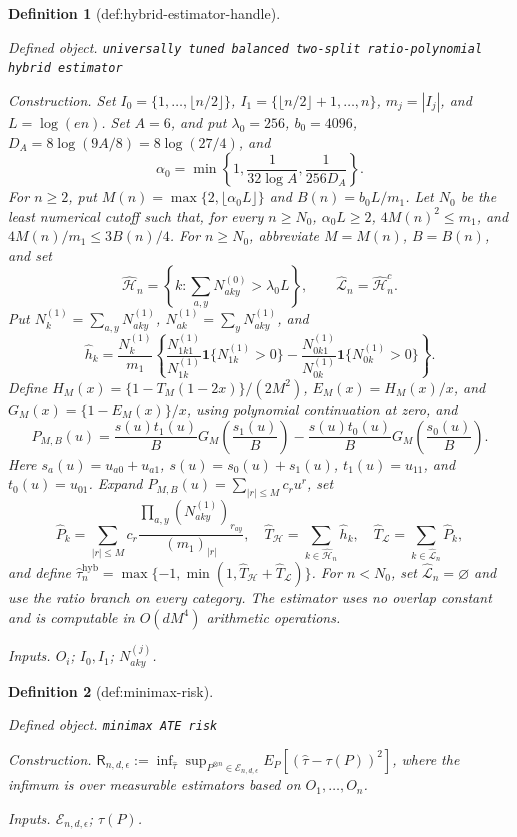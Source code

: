 \documentclass{article}
\newtheorem{definition}{Definition}
\begin{document}
\begin{definition}[def:hybrid-estimator-handle]\label{def:hybrid-estimator-handle}
\par\smallskip\noindent\emph{Defined object.} \texttt{universally tuned balanced two-split ratio-polynomial hybrid estimator}
\par\smallskip\noindent\emph{Construction.} Set \(I_0=\{1,\ldots,\lfloor n/2\rfloor\}\), \(I_1=\{\lfloor n/2\rfloor+1,\ldots,n\}\), \(m_j=|I_j|\), and \(L=\log(en)\). Set \(A=6\), and put \(\lambda_0=256\), \(b_0=4096\), \(D_A=8\log(9A/8)=8\log(27/4)\), and
\[
\alpha_0=\min\left\{1,\frac1{32\log A},\frac1{256D_A}\right\}.
\]
For \(n\ge2\), put \(M(n)=\max\{2,\lfloor\alpha_0L\rfloor\}\) and \(B(n)=b_0L/m_1\). Let \(N_0\) be the least numerical cutoff such that, for every \(n\ge N_0\), \(\alpha_0L\ge2\), \(4M(n)^2\le m_1\), and \(4M(n)/m_1\le3B(n)/4\). For \(n\ge N_0\), abbreviate \(M=M(n)\), \(B=B(n)\), and set
\[
\widehat{\mathcal H}_n=\left\{k:\sum_{a,y}N^{(0)}_{aky}>\lambda_0L\right\},\qquad \widehat{\mathcal L}_n=\widehat{\mathcal H}_n^c.
\]
Put \(N_k^{(1)}=\sum_{a,y}N^{(1)}_{aky}\), \(N_{ak}^{(1)}=\sum_yN^{(1)}_{aky}\), and
\[
\widehat h_k=\frac{N_k^{(1)}}{m_1}\left\{\frac{N^{(1)}_{1k1}}{N^{(1)}_{1k}}\mathbf1\{N^{(1)}_{1k}>0\}-\frac{N^{(1)}_{0k1}}{N^{(1)}_{0k}}\mathbf1\{N^{(1)}_{0k}>0\}\right\}.
\]
Define \(H_M(x)=\{1-T_M(1-2x)\}/(2M^2)\), \(E_M(x)=H_M(x)/x\), and \(G_M(x)=\{1-E_M(x)\}/x\), using polynomial continuation at zero, and
\[
P_{M,B}(u)=\frac{s(u)t_1(u)}B G_M\!\left(\frac{s_1(u)}B\right)-\frac{s(u)t_0(u)}B G_M\!\left(\frac{s_0(u)}B\right).
\]
Here \(s_a(u)=u_{a0}+u_{a1}\), \(s(u)=s_0(u)+s_1(u)\), \(t_1(u)=u_{11}\), and \(t_0(u)=u_{01}\). Expand \(P_{M,B}(u)=\sum_{|r|\le M}c_ru^r\), set
\[
\widehat P_k=\sum_{|r|\le M}c_r\frac{\prod_{a,y}(N^{(1)}_{aky})_{r_{ay}}}{(m_1)_{|r|}},\quad \widehat T_{\mathcal H}=\sum_{k\in\widehat{\mathcal H}_n}\widehat h_k,\quad \widehat T_{\mathcal L}=\sum_{k\in\widehat{\mathcal L}_n}\widehat P_k,
\]
and define \(\widehat\tau_n^{\mathrm{hyb}}=\max\{-1,\min(1,\widehat T_{\mathcal H}+\widehat T_{\mathcal L})\}\). For \(n<N_0\), set \(\widehat{\mathcal L}_n=\varnothing\) and use the ratio branch on every category. The estimator uses no overlap constant and is computable in \(O(dM^4)\) arithmetic operations.
\par\smallskip\noindent\emph{Inputs.} \(O_i\); \(I_0,I_1\); \(N^{(j)}_{aky}\).
\end{definition}

\begin{definition}[def:minimax-risk]\label{def:minimax-risk}
\par\smallskip\noindent\emph{Defined object.} \texttt{minimax ATE risk}
\par\smallskip\noindent\emph{Construction.} \(\mathsf R_{n,d,\epsilon}:=\inf_{\widehat\tau}\sup_{P^{\otimes n}\in\mathcal E_{n,d,\epsilon}}E_P[(\widehat\tau-\tau(P))^2]\), where the infimum is over measurable estimators based on \(O_1,\ldots,O_n\).
\par\smallskip\noindent\emph{Inputs.} \(\mathcal E_{n,d,\epsilon}\); \(\tau(P)\).
\end{definition}
\end{document}
